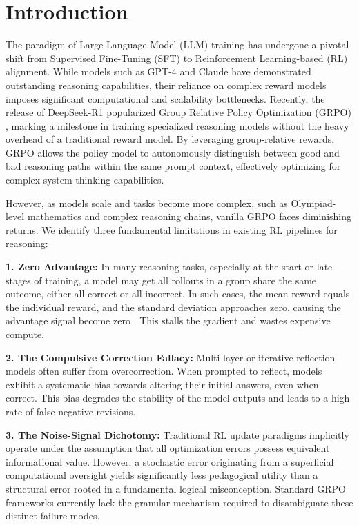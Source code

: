 \section{Introduction}

The paradigm of Large Language Model (LLM) training has undergone a pivotal shift from Supervised Fine-Tuning (SFT) to Reinforcement Learning-based (RL) alignment. While models such as GPT-4 \cite{Achiam2023GPT4TR} and Claude \cite{TheC3} have demonstrated outstanding reasoning capabilities, their reliance on complex reward models imposes significant computational and scalability bottlenecks. Recently, the release of DeepSeek-R1 popularized Group Relative Policy Optimization (GRPO) \cite{deepseekmath}, marking a milestone in training specialized reasoning models without the heavy overhead of a traditional reward model. By leveraging group-relative rewards, GRPO allows the policy model to autonomously distinguish between good and bad reasoning paths within the same prompt context, effectively optimizing for complex system thinking capabilities.

However, as models scale and tasks become more complex, such as Olympiad-level mathematics and complex reasoning chains, vanilla GRPO faces diminishing returns. We identify three fundamental limitations in existing RL pipelines for reasoning:

\textbf{1. Zero Advantage:} In many reasoning tasks, especially at the start or late stages of training, a model may get all rollouts in a group share the same outcome, either all correct or all incorrect. In such cases, the mean reward equals the individual reward, and the standard deviation approaches zero, causing the advantage signal become zero \cite{zhang2026trainlesslearnmore}. This stalls the gradient and wastes expensive compute.

\textbf{2. The Compulsive Correction Fallacy:} Multi-layer \cite{mgrpo} or iterative reflection models \cite{madaan2023selfrefineiterativerefinementselffeedback} often suffer from overcorrection. When prompted to reflect, models exhibit a systematic bias towards altering their initial answers, even when correct. This bias degrades the stability of the model outputs and leads to a high rate of false-negative revisions.

\textbf{3. The Noise-Signal Dichotomy:} Traditional RL update paradigms implicitly operate under the assumption that all optimization errors possess equivalent informational value. However, a stochastic error originating from a superficial computational oversight yields significantly less pedagogical utility than a structural error rooted in a fundamental logical misconception. Standard GRPO frameworks currently lack the granular mechanism required to disambiguate these distinct failure modes.

